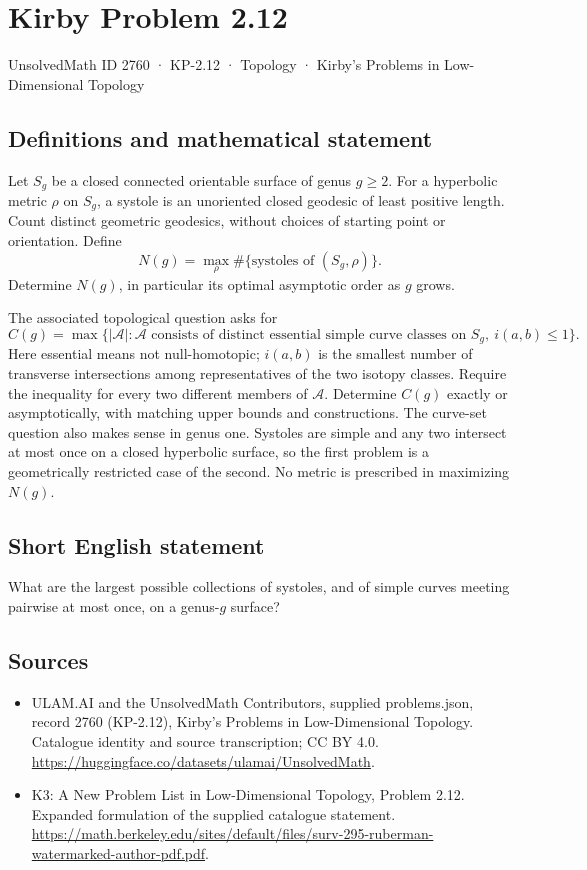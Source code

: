 \documentclass[11pt,a4paper]{article}
\begin{document}
\section*{Kirby Problem 2.12}\label{2760}
{\small UnsolvedMath ID 2760 · KP-2.12 · Topology · Kirby's Problems in Low-Dimensional Topology}
\subsection{Definitions and mathematical statement}
Let $S_g$ be a closed connected orientable surface of genus $g\geq2$. For a
hyperbolic metric $\rho$ on $S_g$, a systole is an unoriented closed geodesic
of least positive length. Count distinct geometric geodesics, without choices
of starting point or orientation. Define
\[
N(g)=\max_{\rho}\#\{\text{systoles of }(S_g,\rho)\}.
\]
Determine $N(g)$, in particular its optimal asymptotic order as $g$ grows.

The associated topological question asks for
\[
C(g)=\max\{|\mathcal A|: \mathcal A\text{ consists of distinct essential
simple curve classes on }S_g,\ i(a,b)\leq1\}.
\]
Here essential means not null-homotopic; $i(a,b)$ is the smallest number of
transverse intersections among representatives of the two isotopy classes.
Require the inequality for every two different members of $\mathcal A$.
Determine $C(g)$ exactly or asymptotically, with matching upper bounds and
constructions. The curve-set question also makes sense in genus one.
Systoles are simple and any two intersect at most once on a closed hyperbolic
surface, so the first problem is a geometrically restricted case of the second.
No metric is prescribed in maximizing $N(g)$.
\subsection{Short English statement}
What are the largest possible collections of systoles, and of simple curves meeting pairwise at most once, on a genus-$g$ surface?
\subsection{Sources}
\begin{itemize}
\item[S1] ULAM.AI and the UnsolvedMath Contributors, supplied problems.json, record 2760 (KP-2.12), Kirby's Problems in Low-Dimensional Topology. Catalogue identity and source transcription; CC BY 4.0.
\url{https://huggingface.co/datasets/ulamai/UnsolvedMath}.
\item[S2] K3: A New Problem List in Low-Dimensional Topology, Problem 2.12. Expanded formulation of the supplied catalogue statement.
\url{https://math.berkeley.edu/sites/default/files/surv-295-ruberman-watermarked-author-pdf.pdf}.
\end{itemize}
\end{document}
